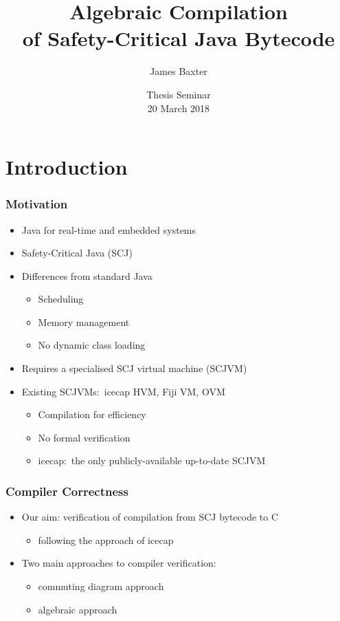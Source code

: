 \documentclass{beamer}
\title[Algebraic Compilation of Safety-Critical Java Bytecode]{Algebraic Compilation\\of Safety-Critical Java Bytecode}
\author{James Baxter}
\date[2018-03-20]{Thesis Seminar\\20 March 2018}
\begin{document}
\frame[plain]{\titlepage}

\section{Introduction}

\begin{frame}
  \frametitle{Motivation}
  \begin{itemize}
  \item Java for real-time and embedded systems
  \item Safety-Critical Java (SCJ)
  \item Differences from standard Java
    \begin{itemize}
    \item Scheduling
    \item Memory management
    \item No dynamic class loading
    \end{itemize}
  \item Requires a specialised SCJ virtual machine (SCJVM)
  \item Existing SCJVMs:~icecap HVM, Fiji VM, OVM
    \begin{itemize}
    \item Compilation for efficiency
    \item No formal verification
    \item icecap:~the only publicly-available up-to-date SCJVM
    \end{itemize}
  \end{itemize}
\end{frame}

\begin{frame}
  \frametitle{Compiler Correctness}
  \begin{itemize}
  \item Our aim: verification of compilation from SCJ bytecode to C
    \begin{itemize}
    \item following the approach of icecap
    \end{itemize}
  \item Two main approaches to compiler verification:
    \begin{itemize}
    \item commuting diagram approach
    \item algebraic approach 
    \end{itemize}
  \end{itemize}
\end{frame}
\end{document}

